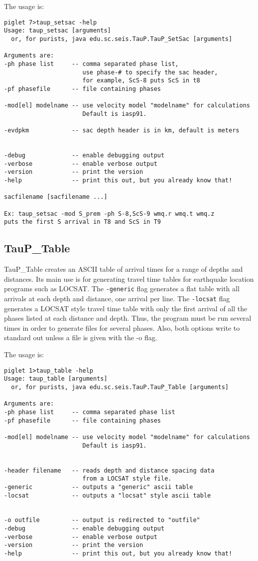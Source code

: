 The usage is:
\begin{verbatim}
piglet 7>taup_setsac -help
Usage: taup_setsac [arguments]
  or, for purists, java edu.sc.seis.TauP.TauP_SetSac [arguments]

Arguments are:
-ph phase list     -- comma separated phase list,
                      use phase-# to specify the sac header,
                      for example, ScS-8 puts ScS in t8
-pf phasefile      -- file containing phases

-mod[el] modelname -- use velocity model "modelname" for calculations
                      Default is iasp91.

-evdpkm            -- sac depth header is in km, default is meters


-debug             -- enable debugging output
-verbose           -- enable verbose output
-version           -- print the version
-help              -- print this out, but you already know that!

sacfilename [sacfilename ...]

Ex: taup_setsac -mod S_prem -ph S-8,ScS-9 wmq.r wmq.t wmq.z
puts the first S arrival in T8 and ScS in T9
\end{verbatim} 

\subsection{TauP\_Table}

TauP\_Table creates an ASCII table of arrival times for a range of depths and
distances. Its main use is for generating travel time tables for earthquake
location programs such as LOCSAT. The \texttt{-generic} flag generates a flat
table with all arrivals at each depth and distance, one arrival per line.
The \texttt{-locsat} flag generates a LOCSAT style travel time table with
only the first arrival of all the phases listed at each distance and depth.
Thus, the program must be run several times in order to generate files for 
several phases. Also, both options write to standard out unless a file is
given with the -o flag.

The usage is:
\begin{verbatim}
piglet 1>taup_table -help
Usage: taup_table [arguments]
  or, for purists, java edu.sc.seis.TauP.TauP_Table [arguments]

Arguments are:
-ph phase list     -- comma separated phase list
-pf phasefile      -- file containing phases

-mod[el] modelname -- use velocity model "modelname" for calculations
                      Default is iasp91.


-header filename   -- reads depth and distance spacing data
                      from a LOCSAT style file.
-generic           -- outputs a "generic" ascii table
-locsat            -- outputs a "locsat" style ascii table


-o outfile         -- output is redirected to "outfile"
-debug             -- enable debugging output
-verbose           -- enable verbose output
-version           -- print the version
-help              -- print this out, but you already know that!
\end{verbatim}

